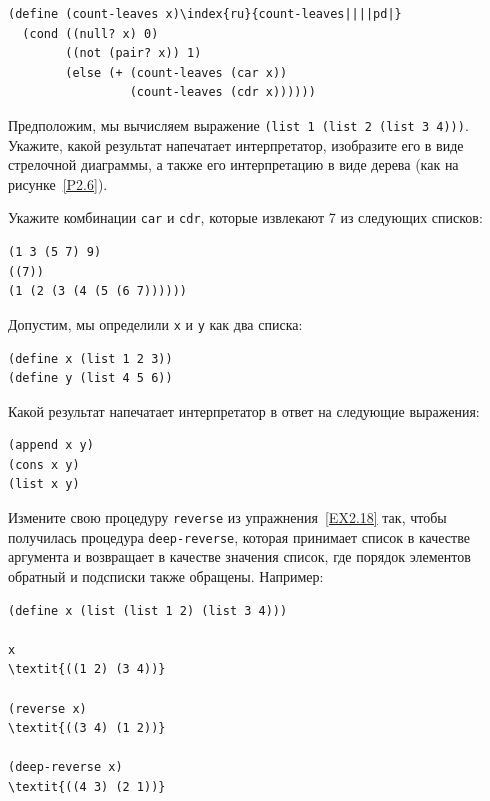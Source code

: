\begin{Verbatim}[fontsize=\small]
(define (count-leaves x)\index{ru}{count-leaves||||pd|}
  (cond ((null? x) 0)
        ((not (pair? x)) 1)
        (else (+ (count-leaves (car x))
                 (count-leaves (cdr x))))))
\end{Verbatim}
\begin{exercise}{2.24}\label{EX2.24}%
Предположим, мы вычисляем выражение {\tt (list 1 (list 2
(list 3 4)))}. Укажите, какой результат напечатает
интерпретатор, изобразите его в виде стрелочной диаграммы, а также
его интерпретацию в виде дерева (как на рисунке~\ref{P2.6}).
\end{exercise}
\begin{exercise}{2.25}\label{EX2.25}%
Укажите комбинации {\tt car} и {\tt cdr}, 
которые извлекают 7 из следующих списков:

\begin{Verbatim}[fontsize=\small]
(1 3 (5 7) 9)
((7))
(1 (2 (3 (4 (5 (6 7))))))
\end{Verbatim}
\end{exercise}
\begin{exercise}{2.26}\label{EX2.26}%
Допустим, мы определили {\tt x} и {\tt y}
как два списка:

\begin{Verbatim}[fontsize=\small]
(define x (list 1 2 3))
(define y (list 4 5 6))
\end{Verbatim}
Какой результат напечатает интерпретатор в ответ на следующие выражения:

\begin{Verbatim}[fontsize=\small]
(append x y)
(cons x y)
(list x y)
\end{Verbatim}
\end{exercise}
\begin{exercise}{2.27}\label{EX2.27}%
Измените свою процедуру {\tt reverse} из
упражнения~\ref{EX2.18} так, чтобы получилась процедура
{\tt deep-reverse},
которая принимает список в качестве
аргумента и возвращает в качестве значения список, где порядок
элементов обратный и подсписки также обращены.  Например:

\begin{Verbatim}[fontsize=\small]
(define x (list (list 1 2) (list 3 4)))

x
\textit{((1 2) (3 4))}

(reverse x)
\textit{((3 4) (1 2))}

(deep-reverse x)
\textit{((4 3) (2 1))}
\end{Verbatim}
\end{exercise}
